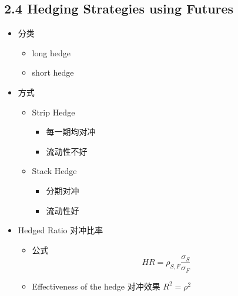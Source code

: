 \documentclass[a4paper,6pt,twoside,openany]{article}
\begin{document}
\subsection*{2.4 Hedging Strategies using Futures}
\begin{itemize}
\item 分类
  \begin{itemize}
  \item long hedge
  \item short hedge
  \end{itemize}
\item 方式
  \begin{itemize}
  \item Strip Hedge
    \begin{itemize}
    \item 每一期均对冲
    \item 流动性不好
    \end{itemize}
  \item Stack Hedge
    \begin{itemize}
    \item 分期对冲
    \item 流动性好
    \end{itemize}
  \end{itemize}
\item Hedged Ratio 对冲比率
  \begin{itemize}
  \item 公式 $$HR = \rho_{S,F}\frac{\sigma_S}{\sigma_F}$$
  \item Effectiveness of the hedge 对冲效果 $R^2 = \rho^2$
  \end{itemize}
\end{itemize}
\end{document}
